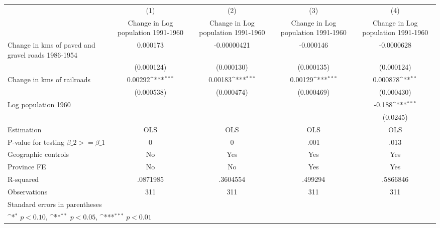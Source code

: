 {
\def\sym#1{\ifmmode^{#1}\else\(^{#1}\)\fi}
\begin{tabular}{l*{4}{c}}
\hline\hline
                    &\multicolumn{1}{c}{(1)}&\multicolumn{1}{c}{(2)}&\multicolumn{1}{c}{(3)}&\multicolumn{1}{c}{(4)}\\
                    &\multicolumn{1}{c}{Change in Log population 1991-1960}&\multicolumn{1}{c}{Change in Log population 1991-1960}&\multicolumn{1}{c}{Change in Log population 1991-1960}&\multicolumn{1}{c}{Change in Log population 1991-1960}\\
\hline
Change in kms of paved and gravel roads 1986-1954&    0.000173         & -0.00000421         &   -0.000146         &  -0.0000628         \\
                    &  (0.000124)         &  (0.000130)         &  (0.000135)         &  (0.000124)         \\
[1em]
Change in kms of railroads&     0.00292\sym{***}&     0.00183\sym{***}&     0.00129\sym{***}&    0.000878\sym{**} \\
                    &  (0.000538)         &  (0.000474)         &  (0.000469)         &  (0.000430)         \\
[1em]
Log population 1960 &                     &                     &                     &      -0.188\sym{***}\\
                    &                     &                     &                     &    (0.0245)         \\
\hline
Estimation          &         OLS         &         OLS         &         OLS         &         OLS         \\
P-value for testing $\beta\_2 >= \beta\_1$&           0         &           0         &        .001         &        .013         \\
Geographic controls &          No         &         Yes         &         Yes         &         Yes         \\
Province FE         &          No         &          No         &         Yes         &         Yes         \\
R-squared           &    .0871985         &    .3604554         &     .499294         &    .5866846         \\
Observations        &         311         &         311         &         311         &         311         \\
\hline\hline
\multicolumn{5}{l}{\footnotesize Standard errors in parentheses}\\
\multicolumn{5}{l}{\footnotesize \sym{*} \(p<0.10\), \sym{**} \(p<0.05\), \sym{***} \(p<0.01\)}\\
\end{tabular}
}
